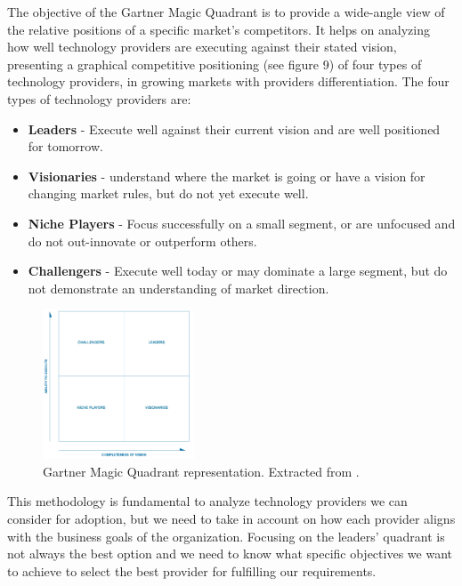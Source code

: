 The objective of the Gartner Magic Quadrant\cite{GartnerMagicQuadrant} is to provide a wide-angle view of the relative positions of a specific market's competitors. It helps on analyzing how well technology providers are executing against their stated vision, presenting a graphical competitive positioning (see figure 9) of four types of technology providers, in growing markets with providers differentiation. The four types of technology providers are:

\begin{itemize}
\item \textbf{Leaders} - Execute well against their current vision and are well positioned for tomorrow.
\item \textbf{Visionaries} - understand where the market is going or have a vision for changing market rules, but do not yet execute well.
\item \textbf{Niche Players} - Focus successfully on a small segment, or are unfocused and do not out-innovate or outperform others.
\item \textbf{Challengers} - Execute well today or may dominate a large segment, but do not demonstrate an understanding of market direction.
\end{itemize}

\begin{figure}
\centering
\includegraphics[width=0.4\textwidth]{img/GartnerMagicQuadrant.png}
\caption{Gartner Magic Quadrant representation. Extracted from \cite{GartnerMagicQuadrant}.}
\end{figure}

This methodology is fundamental to analyze technology providers we can consider for adoption, but we need to take in account on how each provider aligns with the business goals of the organization. Focusing on the leaders' quadrant is not always the best option and we need to know what specific objectives we want to achieve to select the best provider for fulfilling our requirements. 


